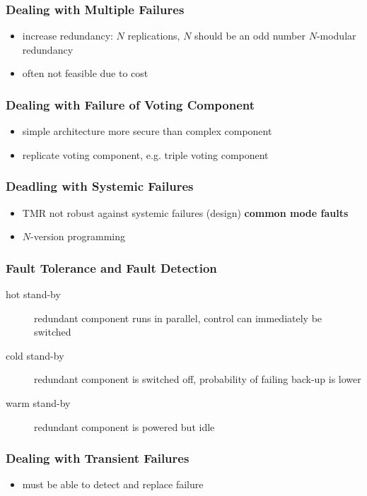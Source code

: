 \documentclass[a4paper, 10pt]{article}
\begin{document}
\subsubsection*{Dealing with Multiple Failures}
\begin{itemize}
    \item increase redundancy: $N$ replications, $N$ should be an odd number \follows $N$-modular redundancy
    \item often not feasible due to cost
\end{itemize}

\subsubsection*{Dealing with Failure of Voting Component}
\begin{itemize}
    \item simple architecture \follows more secure than complex component
    \item replicate voting component, e.g. triple voting component
\end{itemize}

\subsubsection*{Deadling with Systemic Failures}
\begin{itemize}
    \item TMR not robust against systemic failures (design) \follows \textbf{common mode faults}
    \item $N$-version programming
\end{itemize}

\subsubsection*{Fault Tolerance and Fault Detection}
\begin{description}
    \item[hot stand-by] redundant component runs in parallel, control can immediately be switched
    \item[cold stand-by] redundant component is switched off, probability of failing back-up is lower
    \item[warm stand-by] redundant component is powered but idle
\end{description}

\subsubsection*{Dealing with Transient Failures}
\begin{itemize}
    \item must be able to detect and replace failure
\end{itemize}
\end{document}
